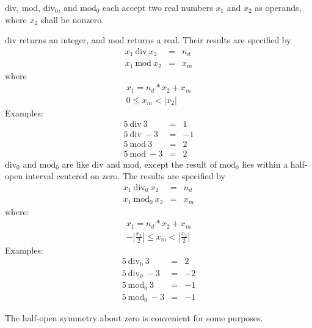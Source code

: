 $\mathrm{div}$, $\mathrm{mod}$, $\mathrm{div}_0$, and $\mathrm{mod}_0$
each accept two real numbers $x_1$ and $x_2$ as operands, where
$x_2$ shall be nonzero.

$\mathrm{div}$ returns an integer, and $\mathrm{mod}$ returns a real.
Their results are specified by
%
\begin{eqnarray*}
x_1~\mathrm{div}~x_2 &=& n_d\\
x_1~\mathrm{mod}~x_2 &=& x_m
\end{eqnarray*}
%
where
%
\begin{displaymath}
\begin{array}{c}
x_1 = n_d * x_2 + x_m\\
0 \leq x_m < |x_2|
\end{array}
\end{displaymath}
%
Examples:
\begin{eqnarray*}
5~\mathrm{div}~3    &=&  1\\
5~\mathrm{div}~-3   &=&  -1\\
5~\mathrm{mod}~3    &=&  2\\
5~\mathrm{mod}~-3   &=&  2
\end{eqnarray*}
%
$\mathrm{div}_0$ and $\mathrm{mod}_0$ are like $\mathrm{div}$ and
$\mathrm{mod}$, except the result of $\mathrm{mod}_0$ lies within a
half-open interval centered on zero.  The results are specified by
%
\begin{eqnarray*}
x_1~\mathrm{div}_0~x_2 &=& n_d\\
x_1~\mathrm{mod}_0~x_2 &=& x_m
\end{eqnarray*}
%
where:
%
\begin{displaymath}
\begin{array}{c}
x_1 = n_d * x_2 + x_m\\
-|\frac{x_2}{2}| \leq x_m < |\frac{x_2}{2}|
\end{array}
\end{displaymath}
%
Examples:
%
\begin{eqnarray*}
5~\mathrm{div}_0~3    &=&  2\\
5~\mathrm{div}_0~-3   &=&  -2\\
5~\mathrm{mod}_0~3    &=&  -1\\
5~\mathrm{mod}_0~-3   &=&  -1
\end{eqnarray*}

\begin{rationale}
The half-open symmetry about zero is convenient for some purposes.
\end{rationale}

